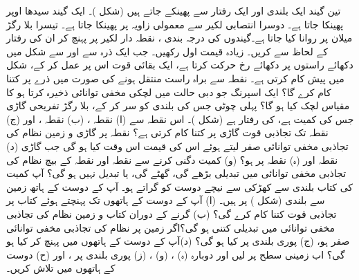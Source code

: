 تین  گیند  ایک بلندی اور ایک رفتار سے پھینکے جاتے ہیں (شکل )۔ ایک گیند سیدھا اوپر پھینکا جاتا ہے۔ دوسرا انتصابی لکیر سے معمولی زاویہ پر پھینکا جاتا ہے۔ تیسرا بلا رگڑ  میلان  پر روانا کیا جاتا ہے۔گیندوں کی درجہ بندی ،  نقطہ دار لکیر پر  پہنچ کر  ان کی  رفتار کے لحاظ سے کریں۔ زیادہ قیمت اول رکھیں۔
جب ایک ذرہ  سے  اور  سے شکل  میں دکھائے راستوں  پر دکھائے رخ حرکت کرتا ہے، ایک بقائی قوت  اس پر عمل کر کے، شکل میں   پیش کام کرتی ہے۔ نقطہ  سے  براہ راست   منتقل ہونے کی صورت میں ذرے پر   کتنا کام   کرے  گا؟
ایک اسپرنگ جو  دبی حالت میں   لچکی مخفی توانائی ذخیرہ کرتا ہو کا  مقیاس لچک کیا ہو گا؟
پہلی چوٹی جس کی بلندی   کو سر کر کے، بلا رگڑ  تفریحی  گاڑی  جس کی کمیت   ہے، کی رفتار   ہے (شکل )۔ اس نقطہ سے  (ا) نقطہ ، (ب) نقطہ ، اور (ج) نقطہ  تک  تجاذبی قوت گاڑی پر کتنا کام کرتی ہے؟ نقطہ  پر گاڑی و زمین نظام کی تجاذبی مخفی توانائی صفر لیتے ہوئے اس کی قیمت اس وقت کیا ہو گی جب گاڑی   (د) نقطہ  اور (ہ) نقطہ  پر ہو؟ (و)  کمیت  دگنی  کرنے سے  نقطہ  اور نقطہ  کے بیچ نظام کی تجاذبی  مخفی توانائی میں تبدیلی بڑھے گی، گھٹے گی، یا تبدیل نہیں ہو گی؟
آپ  کمیت کی   کتاب  بلندی  سے کھڑکی سے  نیچے    دوست کو گراتے ہو۔   آپ کے دوست کے ہاتھ زمین سے   بلندی  (شکل ) پر ہیں۔ (ا)   آپ کے دوست کے  ہاتھوں تک پہنچتے ہوئے کتاب پر تجاذبی قوت کتنا کام   کرے گی؟ (ب)   گرنے کے دوران کتاب و زمین نظام کی  تجاذبی مخفی توانائی  میں  تبدیلی   کتنی ہو گی؟اگر  زمین پر نظام کی تجاذبی مخفی توانائی   صفر ہو،  (ج)   پوری بلندی پر   کیا ہو گی؟ (د)آپ کے  دوست کے  ہاتھوں میں پہنچ کر  کیا ہو گی؟ اب  زمینی سطح پر  لیں اور دوبارہ   (ہ)  ، (و) ، (ز) پوری بلندی پر ، اور (ح) دوست کے ہاتھوں میں  تلاش کریں۔
